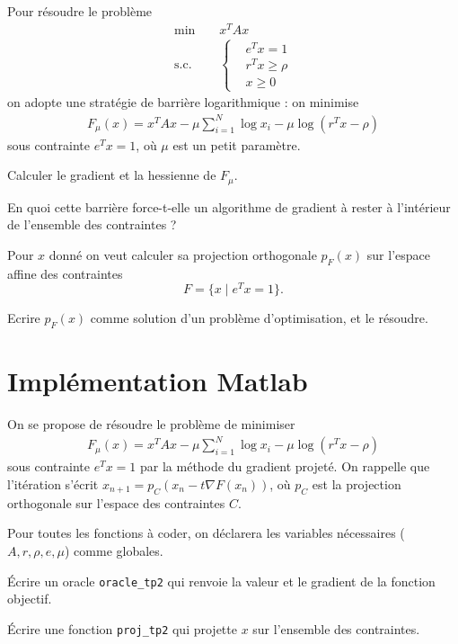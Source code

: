 \documentclass[10pt,a4paper,fleqn]{report}
\begin{document}
\begin{exercice}
  Pour résoudre le problème 
\begin{align*}
  \text{min} \;\;\;\;&x^{T} A x\\
  \text{s.c.}\;\;\;\;&\begin{cases}
    &e^{T} x = 1\\
  &r^{T} x \geq \rho\\
  &x \geq 0
  \end{cases}
\end{align*}
on adopte une stratégie de barrière logarithmique : on minimise
\begin{align*}
  F_{\mu}(x) = x^{T} A x - \mu \sum_{i=1}^{N} \log x_{i} - \mu \log (r^{T}x
  - \rho)
\end{align*}
sous contrainte $e^{T} x = 1$, où $\mu$ est un petit paramètre.


  \begin{questions}
  \item Calculer le gradient et la hessienne de $F_{\mu}$.
  \item En quoi cette barrière force-t-elle un algorithme de gradient
    à rester à l'intérieur de l'ensemble des contraintes ?
  \end{questions}
\end{exercice}

\begin{exercice}[(projection)]
  Pour $x$ donn\'e on veut calculer sa projection
  orthogonale $p_{F}(x)$ sur l'espace affine des contraintes
  \[F = \{x \; | \; e^{T} x = 1\}.\]
  
  Ecrire $p_F(x)$ comme solution d'un problème d'optimisation, et le
  r\'esoudre.
\end{exercice}

\section{Implémentation Matlab}
\begin{exercice}
  On se propose de résoudre le problème de minimiser
\begin{align*}
  F_{\mu}(x) = x^{T} A x - \mu \sum_{i=1}^{N} \log x_{i} - \mu \log (r^{T}x
  - \rho)
\end{align*}
sous contrainte $e^{T} x = 1$ par la méthode du gradient projeté. On
rappelle que l'itération s'écrit $x_{n+1} = p_{C}(x_{n} - t \nabla
F(x_{n}))$, où $p_{C}$ est la projection orthogonale sur l'espace des
contraintes $C$.

Pour toutes les fonctions à coder,
on déclarera les variables nécessaires ($A, r, \rho, e,\mu$) comme
globales.
\begin{questions}
\item Écrire un oracle \verb+oracle_tp2+ qui renvoie la valeur et le
  gradient de la fonction objectif.
\item Écrire une fonction \verb+proj_tp2+ qui projette $x$ sur l'ensemble
  des contraintes.
\end{questions}

\end{exercice}
\end{document}
